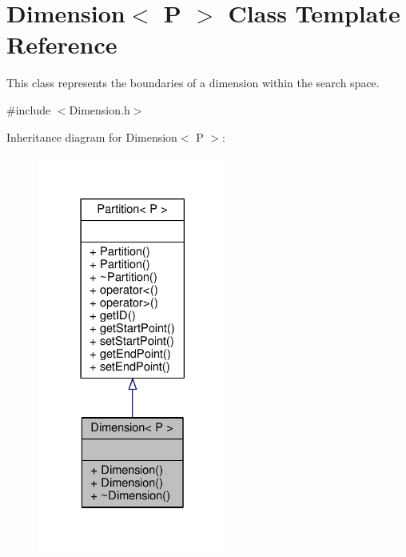 \hypertarget{classDimension}{}\section{Dimension$<$ P $>$ Class Template Reference}
\label{classDimension}


This class represents the boundaries of a dimension within the search space.  




{\ttfamily \#include $<$Dimension.\+h$>$}



Inheritance diagram for Dimension$<$ P $>$\+:
\nopagebreak
\begin{figure}[H]
\begin{center}
\leavevmode
\includegraphics[width=177pt]{classDimension__inherit__graph}
\end{center}
\end{figure}


